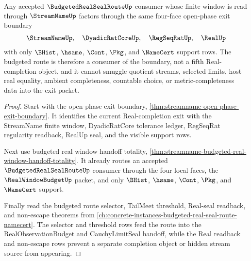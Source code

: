 \begin{theorem}
\label{thm:streamname-open-phase-budget-route-lock}
Any accepted $\BudgetedRealSealRouteUp$ consumer whose finite window is read through $\StreamNameUp$ factors through the same four-face open-phase exit boundary
$$
\StreamNameUp,\quad \DyadicRatCoreUp,\quad \RegSeqRatUp,\quad \RealUp
$$
with only $\BHist$, $\hsame$, $\Cont$, $\Pkg$, and $\NameCert$ support rows. The budgeted route is therefore a consumer of the boundary, not a fifth Real-completion object, and it cannot smuggle quotient streams, selected limits, host real equality, ambient completeness, countable choice, or metric-completeness data into the exit packet.
\end{theorem}
\begin{proof}
Start with the open-phase exit boundary, \autoref{thm:streamname-open-phase-exit-boundary}. It identifies the current Real-completion exit with the StreamName finite window, DyadicRatCore tolerance ledger, RegSeqRat regularity readback, RealUp seal, and the visible support rows.

Next use budgeted real window handoff totality, \autoref{thm:streamname-budgeted-real-window-handoff-totality}. It already routes an accepted $\BudgetedRealSealRouteUp$ consumer through the four local faces, the $\RealWindowBudgetUp$ packet, and only $\BHist$, $\hsame$, $\Cont$, $\Pkg$, and $\NameCert$ support.

Finally read the budgeted route selector, TailMeet threshold, Real-seal readback, and non-escape theorems from \autoref{ch:concrete-instances-budgeted-real-seal-route-namecert}. The selector and threshold rows feed the route into the RealObservationBudget and CauchyLimitSeal handoff, while the Real readback and non-escape rows prevent a separate completion object or hidden stream source from appearing.
\end{proof}

